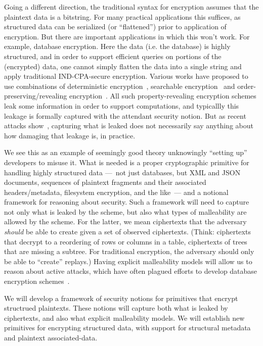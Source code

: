Going a different direction, the traditional syntax for encryption assumes that
the plaintext data is a bitstring.  For many practical applications this
suffices, as structured data can be serialized (or ``flattened'') prior to
application of encryption.  But there are important applications in which this
won't work.  For example, database encryption.  Here the data (i.e. the
database) is highly structured, and in order to support efficient queries on
portions of the (encrypted) data, one cannot simply flatten the data into a
single string and apply traditional IND-CPA-secure encryption.  Various works
have proposed to use combinations of deterministic
encryption~\cite{BBO07}, searchable
encryption~\cite{CJJ+13} and order-preserving/revealing
encryption~\cite{KW16}. All such property-revealing encryption schemes leak some
information in order to support computations, and typicallly this leakage is
formally captured with the attendant security notion.  But as recent attacks
show~\cite{Cash15,GSB+17,NKW15}, capturing what is
leaked does not necessarily say anything about how damaging that leakage is, in
practice.

We see this as an example of seemingly good theory unknowingly
``setting up'' developers to misuse it.  What is needed is a proper
cryptographic primitive for handling highly structured data ---~not
just databases, but XML and JSON documents, sequences of plaintext
fragments and their associated headers/metadata, filesystem
encryption, and the like~--- and a notional framework for reasoning
about security.  Such a framework will need to capture not only what
is leaked by the scheme, but also what types of malleability are
allowed by the scheme.  For the latter, we mean ciphertexts that the
adversary \emph{should} be able to create given a set of observed
ciphertexts.  (Think: ciphertexts that decrypt to a reordering of rows
or columns in a table, ciphertexts of trees that are missing a
subtree.  For traditional encryption, the adversary should only be
able to ``create'' replays.)  Having explicit malleability models will allow us to
reason about active attacks, which have often plagued efforts to
develop database encryption schemes~\cite{GRS17}.

\begin{task}
We will develop a framework of security notions for primitives that
encrypt structrued plaintexts.  These notions will capture both what
is leaked by ciphertexts, and also what explicit malleability models.
We will establish new primitives for encrypting structured data, with
support for structural metadata and plaintext associated-data.
\end{task}



